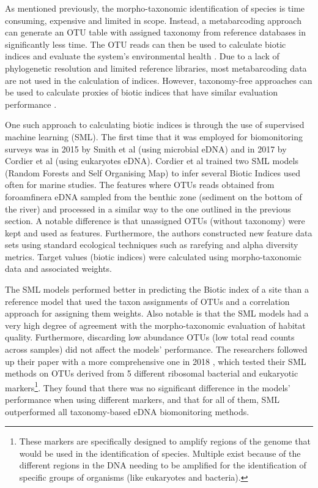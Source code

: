 As mentioned previously, the morpho-taxonomic identification of species is time consuming, expensive and limited in scope. Instead, a metabarcoding approach can generate an OTU table with assigned taxonomy from reference databases in significantly less time. The OTU reads can then be used to calculate biotic indices and evaluate the system's environmental health  \cite{lejzerowicz_high-throughput_2015}. Due to a lack of phylogenetic resolution and limited reference libraries, most metabarcoding data are not used in the calculation of indices. However, taxonomy-free approaches can be used to calculate proxies of biotic indices that have similar evaluation performance \cite{apotheloz-perret-gentil_taxonomy-free_2017}. 

One such approach to calculating biotic indices is through the use of supervised machine learning (SML). The first time that it was employed for biomonitoring surveys was in 2015 by Smith et al \cite{smith_natural_2015} (using microbial eDNA) and in 2017 by Cordier et al \cite{cordier_predicting_2017} (using eukaryotes eDNA). Cordier et al trained two SML models (Random Forests and Self Organising Map) to infer several Biotic Indices used often for marine studies. The features where OTUs reads obtained from foroamfinera eDNA sampled from the benthic zone (sediment on the bottom of the river) and processed in a similar way to the one outlined in the previous section. A notable difference is that unassigned OTUs (without taxonomy) were kept and used as features. Furthermore, the authors constructed new feature data sets using standard ecological techniques such as rarefying and alpha diversity metrics. Target values (biotic indices) were calculated using morpho-taxonomic data and associated weights. 

The SML models performed better in predicting the Biotic index of a site than a reference model that used the taxon assignments of OTUs and a correlation approach for assigning them weights. Also notable is that the SML models had a very high degree of agreement with the morpho-taxonomic evaluation of habitat quality. Furthermore, discarding low abundance OTUs (low total read counts across samples) did not affect the models' performance. The researchers followed up their paper with a more comprehensive one in 2018 \cite{cordier_supervised_2018}, which tested their SML methods on OTUs derived from 5 different ribosomal bacterial and eukaryotic markers\footnote{These markers are specifically designed to amplify regions of the genome that would be used in the identification of species. Multiple exist because of the different regions in the DNA needing to be amplified for the identification of specific groups of organisms (like eukaryotes and bacteria).}. They found that there was no significant difference in the models' performance when using different markers, and that for all of them, SML outperformed all taxonomy-based eDNA biomonitoring methods. 



